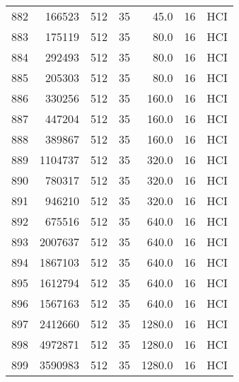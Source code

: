 \begin{longtable}{lrrrrrl}
882 &    166523 &        512 &        35 &           45.0 &      16 &  HCI \\
883 &    175119 &        512 &        35 &           80.0 &      16 &  HCI \\
884 &    292493 &        512 &        35 &           80.0 &      16 &  HCI \\
885 &    205303 &        512 &        35 &           80.0 &      16 &  HCI \\
886 &    330256 &        512 &        35 &          160.0 &      16 &  HCI \\
887 &    447204 &        512 &        35 &          160.0 &      16 &  HCI \\
888 &    389867 &        512 &        35 &          160.0 &      16 &  HCI \\
889 &   1104737 &        512 &        35 &          320.0 &      16 &  HCI \\
890 &    780317 &        512 &        35 &          320.0 &      16 &  HCI \\
891 &    946210 &        512 &        35 &          320.0 &      16 &  HCI \\
892 &    675516 &        512 &        35 &          640.0 &      16 &  HCI \\
893 &   2007637 &        512 &        35 &          640.0 &      16 &  HCI \\
894 &   1867103 &        512 &        35 &          640.0 &      16 &  HCI \\
895 &   1612794 &        512 &        35 &          640.0 &      16 &  HCI \\
896 &   1567163 &        512 &        35 &          640.0 &      16 &  HCI \\
897 &   2412660 &        512 &        35 &         1280.0 &      16 &  HCI \\
898 &   4972871 &        512 &        35 &         1280.0 &      16 &  HCI \\
899 &   3590983 &        512 &        35 &         1280.0 &      16 &  HCI \\
\end{longtable}
